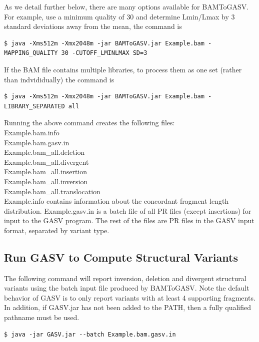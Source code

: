 \documentclass[11pt]{article}
\begin{document}
As we detail further below, there are many options available for BAMToGASV. For example, use a minimum quality of $30$ and determine Lmin/Lmax by 3 standard deviations away from the mean, the command is

{\scriptsize
\begin{Verbatim}[frame=single]
 $ java -Xms512m -Xmx2048m -jar BAMToGASV.jar Example.bam -MAPPING_QUALITY 30 -CUTOFF_LMINLMAX SD=3
\end{Verbatim}
}

If the BAM file contains multiple libraries, to process them as one set (rather than indvididually) the command is
{\small
\begin{Verbatim}[frame=single]
$ java -Xms512m -Xmx2048m -jar BAMToGASV.jar Example.bam -LIBRARY_SEPARATED all
\end{Verbatim}
}

\noindent Running the above command creates the following files:\\

\noindent Example.bam.info\\
\noindent Example.bam.gasv.in \\
\noindent Example.bam\_all.deletion \\
\noindent Example.bam\_all.divergent \\
\noindent Example.bam\_all.insertion \\
\noindent Example.bam\_all.inversion \\
\noindent Example.bam\_all.translocation\\

Example.info contains information about the concordant fragment length
distribution.   Example.gasv.in is a batch file of all PR files (except insertions) for input to the GASV program.
The rest of the files are PR files in the GASV input format, separated by variant type.

\subsection{Run GASV to Compute Structural Variants}

The following command will report inversion, deletion and divergent structural variants using the batch input file produced by BAMToGASV. Note the default behavior of GASV is to only report variants with at least 4 supporting fragments.  
In addition, if GASV.jar has not been added to the PATH, then a fully qualified pathname must be used.

{
\begin{Verbatim}[frame=single]
$ java -jar GASV.jar --batch Example.bam.gasv.in
\end{Verbatim}
}
\end{document}
